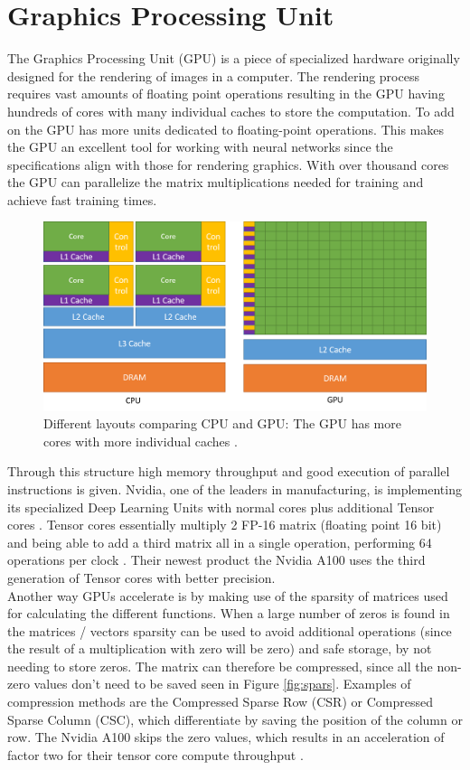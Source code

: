 \documentclass[conference]{IEEEtran}
\begin{document}
	\section{Graphics Processing Unit}
	The Graphics Processing Unit (GPU) is a piece of specialized hardware originally designed for the rendering of images in a computer. The rendering process requires vast amounts of floating point operations resulting in the GPU having hundreds of cores with many individual caches to store the computation. To add on the GPU has more units dedicated to floating-point operations. This makes the GPU an excellent tool for working with neural networks since the specifications align with those for rendering graphics. With over thousand cores the GPU can parallelize the matrix multiplications needed for training and achieve fast training times. 
	\begin{figure}[H]
		\centering
		\includegraphics[width=\linewidth]{pictures/intel_comparison.png}
		\caption{Different layouts comparing CPU and GPU: The GPU has more cores with more individual caches \cite{intelpic_comparison}.}
	\end{figure}
	Through this structure high memory throughput and good execution of parallel instructions is given. Nvidia, one of the leaders in manufacturing, is implementing its specialized Deep Learning Units with normal cores plus additional Tensor cores \cite{nvidiav100}. Tensor cores essentially multiply 2 FP-16 matrix (floating point 16 bit) and being able to add a third matrix all in a single operation, performing 64 operations per clock \cite{tensorcores}. Their newest product the Nvidia A100 uses the third generation of Tensor cores with better precision.
	\\
	Another way GPUs accelerate is by making use of the sparsity of matrices used for calculating the different functions. When a large number of zeros is found in the matrices / vectors sparsity can be used to avoid additional operations (since the result of a multiplication with zero will be zero) and safe storage, by not needing to store zeros. The matrix can therefore be compressed, since all the non-zero values don't need to be saved seen in Figure \ref{fig:spars}. Examples of compression methods are the Compressed Sparse Row (CSR) or Compressed Sparse Column (CSC), which differentiate by saving the position of the column or row. The Nvidia A100 skips the zero values, which results in an acceleration of factor two for their tensor core compute throughput \cite{nvidia100}. 
\end{document}

